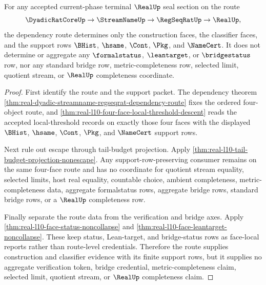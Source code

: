 \begin{theorem}
\label{thm:real-l10-dependency-route-axis-independence}
For any accepted current-phase terminal $\RealUp$ seal section on the route
$$
\DyadicRatCoreUp \to \StreamNameUp \to \RegSeqRatUp \to \RealUp ,
$$
the dependency route determines only the construction faces, the classifier faces, and the support rows $\BHist$, $\hsame$, $\Cont$, $\Pkg$, and $\NameCert$. It does not determine or aggregate any $\formalstatus$, $\leantarget$, or $\bridgestatus$ row, nor any standard bridge row, metric-completeness row, selected limit, quotient stream, or $\RealUp$ completeness coordinate.
\end{theorem}
\begin{proof}
First identify the route and the support packet. The dependency theorem \autoref{thm:real-dyadic-streamname-regseqrat-dependency-route} fixes the ordered four-object route, and \autoref{thm:real-l10-four-face-local-threshold-descent} reads the accepted local-threshold records on exactly those four faces with the displayed $\BHist$, $\hsame$, $\Cont$, $\Pkg$, and $\NameCert$ support rows.

Next rule out escape through tail-budget projection. Apply \autoref{thm:real-l10-tail-budget-projection-nonescape}. Any support-row-preserving consumer remains on the same four-face route and has no coordinate for quotient stream equality, selected limits, host real equality, countable choice, ambient completeness, metric-completeness data, aggregate formalstatus rows, aggregate bridge rows, standard bridge rows, or a $\RealUp$ completeness row.

Finally separate the route data from the verification and bridge axes. Apply \autoref{thm:real-l10-face-status-noncollapse} and \autoref{thm:real-l10-face-leantarget-noncollapse}. These keep status, Lean-target, and bridge-status rows as face-local reports rather than route-level credentials. Therefore the route supplies construction and classifier evidence with its finite support rows, but it supplies no aggregate verification token, bridge credential, metric-completeness claim, selected limit, quotient stream, or $\RealUp$ completeness claim.
\end{proof}

